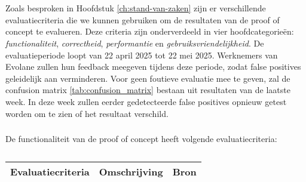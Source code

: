 
\chapter{}%
\label{ch:evaluatie}


\section{}
\label{sec:evaluatie-criteria}

Zoals besproken in Hoofdstuk \ref{ch:stand-van-zaken} zijn er verschillende evaluatiecriteria die we kunnen gebruiken om de resultaten van de proof of concept te evalueren. 
Deze criteria zijn onderverdeeld in vier hoofdcategorieën: \textit{functionaliteit}, \textit{correctheid}, \textit{performantie} en \textit{gebruiksvriendelijkheid}. 
De evaluatieperiode loopt van 22 april 2025 tot 22 mei 2025. 
Werknemers van Evolane zullen hun feedback meegeven tijdens deze periode, zodat false positives geleidelijk aan verminderen. 
Voor geen foutieve evaluatie mee te geven, zal de confusion matrix \ref{tab:confusion_matrix} bestaan uit resultaten van de laatste week. 
In deze week zullen eerder gedetecteerde false positives opnieuw getest worden om te zien of het resultaat verschild. 


\subsection{}
\label{sec:functionaliteit}

De functionaliteit van de proof of concept heeft volgende evaluatiecriteria:

\begin{table}[h]
    \centering
    \small
    \begin{tabular}{p{4cm} p{6cm} p{6cm}}
        \toprule
        \textbf{Evaluatiecriteria} & \textbf{Omschrijving} & \textbf{Bron} \\
        \midrule
        

    \end{tabular}
    \caption{}
    \label{tab:eval-criteria-functionality}
\end{table}

